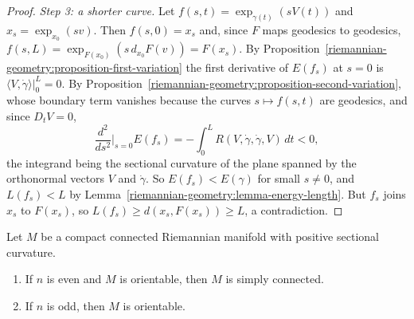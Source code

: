 \begin{proof}
\emph{Step 3: a shorter curve.} Let $f(s, t) = \exp_{\gamma(t)}(sV(t))$ and $x_s = \exp_{x_0}(sv)$. Then $f(s, 0) = x_s$ and, since $F$ maps geodesics to geodesics,
$f(s, L) = \exp_{F(x_0)}(s\,d_{x_0}F(v)) = F(x_s)$. By Proposition~\ref{riemannian-geometry:proposition-first-variation} the first derivative of $E(f_s)$ at $s = 0$ is
$\langle V, \dot\gamma\rangle|_0^L = 0$. By Proposition~\ref{riemannian-geometry:proposition-second-variation}, whose boundary term vanishes because the curves
$s \mapsto f(s, t)$ are geodesics, and since $D_tV = 0$,
\[
\frac{d^2}{ds^2}\Big|_{s=0}E(f_s) = -\int_0^LR(V, \dot\gamma, \dot\gamma, V)\,dt < 0,
\]
the integrand being the sectional curvature of the plane spanned by the orthonormal vectors $V$ and $\dot\gamma$. So $E(f_s) < E(\gamma)$ for small $s \neq 0$, and
$L(f_s) < L$ by Lemma~\ref{riemannian-geometry:lemma-energy-length}. But $f_s$ joins $x_s$ to $F(x_s)$, so $L(f_s) \geq d(x_s, F(x_s)) \geq L$, a contradiction.
\end{proof}

\begin{corollary}[Synge]\label{riemannian-geometry:corollary-synge}
Let $M$ be a compact connected Riemannian manifold with positive sectional curvature.
\begin{enumerate}
\item If $n$ is even and $M$ is orientable, then $M$ is simply connected.
\item If $n$ is odd, then $M$ is orientable.
\end{enumerate}
\end{corollary}

